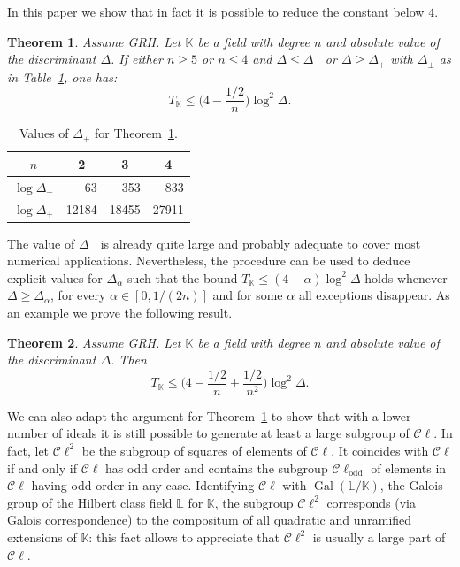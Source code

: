 \documentclass[a4paper,11pt]{amsart}
\newcommand{\field}[1]{\mathbb{{#1}}}
\newcommand{\K}{\field{{K}}}
\renewcommand{\L}{\field{{L}}}
\newcommand{\Cl}{\mathcal C\!\ell}
\DeclareMathOperator{\odd}{odd}
\DeclareMathOperator{\Gal}{Gal}
\newtheorem{theorem}{Theorem}
\theoremstyle{remark}
\begin{document}
In this paper we show that in fact it is possible to reduce the constant below $4$.
%
\begin{theorem}\label{th:1A}
Assume GRH. Let $\K$ be a field with degree $n$ and absolute value of the discriminant $\Delta$. If
either $n\geq 5$ or $n\leq 4$ and $\Delta\leq\Delta_{-}$ or $\Delta\geq\Delta_{+}$ with $\Delta_{\pm}$ as
in Table~\ref{tab:1A}, one has:
\begin{equation}\label{eq:1A}
T_\K \leq \Big(4-\frac{1/2}{n}\Big) \log^2\Delta.
\end{equation}
\end{theorem}
%
\begin{table}[h]
\def\z{\phantom{0}}
\def\m#1{\multicolumn{1}{c}{#1}}
\begin{tabular}{crrr}
 $n$              & \m{2} & \m{3} & \m{4} \\
  \hline
 $\log\Delta_{-}$ &    63 &   353 &   833 \\
 $\log\Delta_{+}$ & 12184 & 18455 & 27911
\end{tabular}
\vspace{0.2cm}
\caption{Values of $\Delta_{\pm}$ for Theorem~\ref{th:1A}.}\label{tab:1A}
\end{table}
%
The value of $\Delta_-$ is already quite large and probably adequate to cover most numerical
applications. Nevertheless, the procedure can be used to deduce explicit values for $\Delta_\alpha$ such
that the bound $T_\K \leq (4-\alpha)\log^2\Delta$ holds whenever $\Delta \geq \Delta_\alpha$, for every
$\alpha\in[0,1/(2n)]$ and for some $\alpha$ all exceptions disappear. As an example we prove the
following result.
%
\begin{theorem}\label{th:2A}
Assume GRH. Let $\K$ be a field with degree $n$ and absolute value of the discriminant $\Delta$. Then
\[
T_\K \leq \Big(4 - \frac{1/2}{n} + \frac{1/2}{n^2}\Big) \log^2\Delta.
\]
\end{theorem}
\smallskip

We can also adapt the argument for Theorem~\ref{th:1A} to show that with a lower number of ideals it is
still possible to generate at least a large subgroup of $\Cl$. In fact, let $\Cl^2$ be the subgroup of
squares of elements of $\Cl$. It coincides with $\Cl$ if and only if $\Cl$ has odd order and contains the
subgroup $\Cl_{\odd}$ of elements in $\Cl$ having odd order in any case.
%
Identifying $\Cl$ with $\Gal(\L/\K)$, the Galois group of the Hilbert class field $\L$ for $\K$, the
subgroup $\Cl^2$ corresponds (via Galois correspondence) to the compositum of all quadratic and unramified
extensions of $\K$: this fact allows to appreciate that $\Cl^2$ is usually a large part of $\Cl$.
\end{document}
